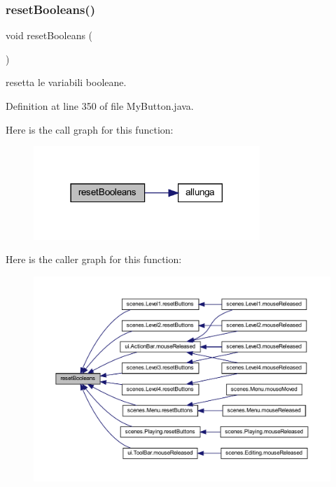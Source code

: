 \subsubsection{\texorpdfstring{reset\+Booleans()}{resetBooleans()}}
{\footnotesize\ttfamily void reset\+Booleans (\begin{DoxyParamCaption}{ }\end{DoxyParamCaption})}



resetta le variabili booleane. 



Definition at line 350 of file My\+Button.\+java.

Here is the call graph for this function\+:\nopagebreak
\begin{figure}[H]
\begin{center}
\leavevmode
\includegraphics[width=242pt]{classui_1_1_my_button_af47bcfe7d6d4ed3655e2c61583e1b5d7_cgraph}
\end{center}
\end{figure}
Here is the caller graph for this function\+:\nopagebreak
\begin{figure}[H]
\begin{center}
\leavevmode
\includegraphics[width=350pt]{classui_1_1_my_button_af47bcfe7d6d4ed3655e2c61583e1b5d7_icgraph}
\end{center}
\end{figure}
\mbox{\label{classui_1_1_my_button_acecf901c15a2150148863cbc4d0709da}} 
